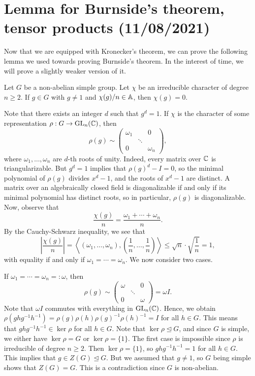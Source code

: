 \section{Lemma for Burnside's theorem, tensor products (11/08/2021)}
Now that we are equipped with Kronecker's theorem, we can prove the following 
lemma we used towards proving Burnside's theorem. In the interest of time, 
we will prove a slightly weaker version of it. 

\begin{lemma}{}
    Let $G$ be a non-abelian simple group. Let $\chi$ be an irreducible character 
    of degree $n \geq 2$. If $g \in G$ with $g \neq 1$ and $\chi(g)/n \in \mathbb{A}$, 
    then $\chi(g) = 0$. 
\end{lemma}
\begin{pf}
    Note that there exists an integer $d$ such that $g^d = 1$. 
    If $\chi$ is the character of some representation $\rho : G \to \operatorname{GL}_n(\mathbb{C})$, 
    then 
    \[ \rho(g) \sim \begin{pmatrix}
        \omega_1 & & 0 \\ 
        & \ddots & \\ 
        0 & & \omega_n 
    \end{pmatrix}, \] 
    where $\omega_1, \dots, \omega_n$ are $d$-th roots of unity. Indeed, every 
    matrix over $\mathbb{C}$ is triangularizable. But $g^d = 1$ implies that 
    $\rho(g)^d - I = 0$, so the minimal polynomial of $\rho(g)$ divides 
    $x^d - 1$, and the roots of $x^d - 1$ are distinct. A matrix over 
    an algebraically closed field is diagonalizable if and only if its minimal 
    polynomial has distinct roots, so in particular, $\rho(g)$ is diagonalizable. 
    Now, observe that 
    \[ \frac{\chi(g)}{n} = \frac{\omega_1 + \cdots + \omega_n}{n}. \] 
    By the Cauchy-Schwarz inequality, we see that 
    \[ \left| \frac{\chi(g)}{n} \right| = 
    \left\langle (\omega_1, \dots, \omega_n), 
    \left( \frac1n, \dots, \frac1n \right) \right\rangle 
    \leq \sqrt n \cdot \sqrt{\frac1n} = 1, \] 
    with equality if and only if $\omega_1 = \cdots = \omega_n$. We now 
    consider two cases. 

    If $\omega_1 = \cdots = \omega_n =: \omega$, then 
    \[ \rho(g) \sim \begin{pmatrix}
        \omega & & 0 \\ 
        & \ddots & \\ 
        0 & & \omega
    \end{pmatrix} = \omega I. \] 
    Note that $\omega I$ commutes with everything in $\operatorname{GL}_n(\mathbb{C})$. Hence, 
    we obtain $\rho(ghg^{-1}h^{-1}) = \rho(g)\rho(h)\rho(g)^{-1}\rho(h)^{-1} 
    = I$ for all $h \in G$. This means that $ghg^{-1}h^{-1} \in \ker\rho$ for 
    all $h \in G$. Note that $\ker\rho \trianglelefteq G$, and since $G$ 
    is simple, we either have $\ker\rho = G$ or $\ker\rho = \{1\}$. The 
    first case is impossible since $\rho$ is irreducible of degree $n \geq 2$. 
    Then $\ker\rho = \{1\}$, so $ghg^{-1}h^{-1} = 1$ for all $h \in G$. 
    This implies that $g \in Z(G) \trianglelefteq G$. But we assumed that 
    $g \neq 1$, so $G$ being simple shows that $Z(G) = G$. This is a 
    contradiction since $G$ is non-abelian. 


\end{pf}
